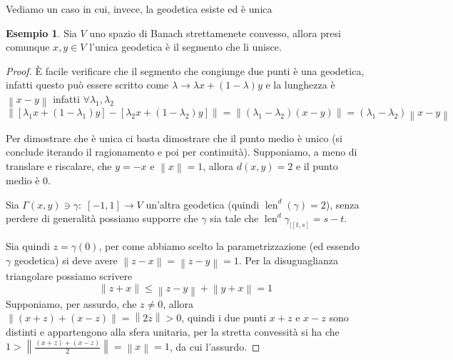 \documentclass[a4paper,10pt]{article}
\newcounter{counter1}
\theoremstyle{plain}
\theoremstyle{definition}
\newtheorem{mydef}[counter1]{Definizione}
\newtheorem{myes}[counter1]{Esempio}
\theoremstyle{remark}
\newcommand{\pa}[1]{\left(#1\right)}
\newcommand{\bra}[1]{\left[#1\right]}
\newcommand{\norm}[1]{\left\|#1\right\|}
\DeclareMathOperator{\len}{len}
\begin{document}
Vediamo un caso in cui, invece, la geodetica esiste ed è unica
\begin{myes}
  Sia $V$ uno spazio di Banach strettamenete convesso, allora presi
  comunque $x,y \in V$ l'unica geodetica è il segmento che li unisce.
\end{myes}
\begin{proof}
  È facile verificare che il segmento che congiunge due punti è una
  geodetica, infatti questo può essere scritto come $\lambda \to
  \lambda x + \pa{1 - \lambda} y$ e la lunghezza è $\norm{x-y}$
  infatti $\forall \lambda _1, \lambda _2$
  \[ \norm{ \bra{ \lambda _1 x + \pa{ 1 - \lambda _1} y } - \bra{
      \lambda _2 x + \pa{ 1 - \lambda _2} y } } = \norm{\pa{\lambda _1
      - \lambda _2 } \pa{ x - y}} = \pa{ \lambda _1 - \lambda _2}
  \norm { x -y} \]

  Per dimostrare che è unica ci basta dimostrare che il punto medio è
  unico (si conclude iterando il ragionamento e poi per
  continuità). Supponiamo, a meno di translare e riscalare, che $y =
  -x$ e $\norm{x} = 1$, allora $d(x,y) = 2$ e il punto medio è $0$.

  Sia $\Gamma(x,y) \ni \gamma :\; \bra{-1,1} \to V$ un'altra geodetica
  (quindi $\len ^d (\gamma) = 2$), senza perdere di generalità
  possiamo supporre che $\gamma$ sia tale che $\len ^d \gamma_{\mid
    \bra{t,s}} = s -t$.

  Sia quindi $z = \gamma(0)$, per come abbiamo scelto la
  parametrizzazione (ed essendo $\gamma$ geodetica) si deve avere
  $\norm{z-x} = \norm{z-y} = 1$. Per la disuguaglianza triangolare
  possiamo scrivere
  \[ \norm{z+x} \le \norm{z-y} + \norm{y+x} = 1 \]
  Supponiamo, per assurdo, che $z \neq 0$, allora $\norm{\pa{x+z} +
    \pa{x-z}} = \norm{2z} >0$, quindi i due punti $x+z$ e $x-z$ sono
  distinti e appartengono alla sfera unitaria, per la stretta
  convessità si ha che $1 > \norm{\frac{(x+z) + (x-z)}{2} } = \norm{x}
  = 1$, da cui l'assurdo.
\end{proof}





\end{document}
